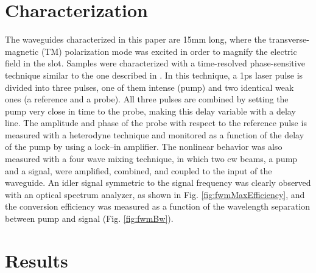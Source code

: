 \documentclass[conference]{IEEEtran}
\begin{document}
\section{Characterization}
The waveguides characterized in this paper are 15mm long, where the transverse-magnetic (TM) polarization mode was excited in order to magnify the electric field in the slot. Samples were characterized with a time-resolved phase-sensitive technique similar to the one described in \cite{Vallaitis2008}. In this technique, a 1ps laser pulse is divided into three pulses, one of them intense (pump) and two identical weak ones (a reference and a probe). All three pulses are combined by setting the pump very close in time to the probe, making this delay variable with a delay line. The amplitude and phase of the probe with respect to the reference pulse is measured with a heterodyne technique and monitored as a function of the delay of the pump by using a lock--in amplifier.
The nonlinear behavior was also measured with a four wave mixing technique, in which two cw beams, a pump and a signal, were amplified, combined, and coupled to the input of the waveguide. An idler signal symmetric to the signal frequency was clearly observed with an optical spectrum analyzer, as shown in Fig. \ref{fig:fwmMaxEfficiency}, and the conversion efficiency was measured as a function of the wavelength separation between pump and signal (Fig. \ref{fig:fwmBw}).


\section{Results}
\end{document}

